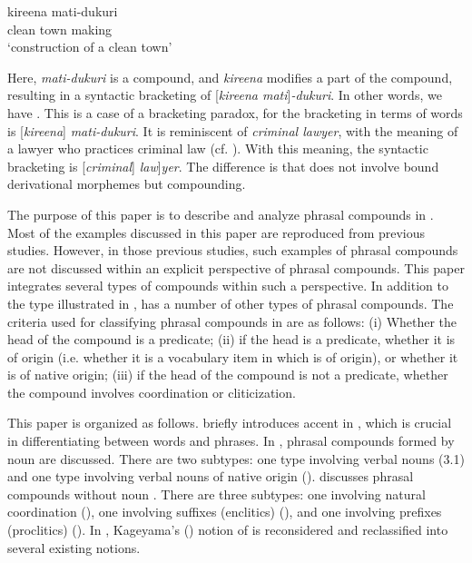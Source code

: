 \documentclass[output=paper]{LSP/langsci}
\begin{document}
\ea\label{ex:nishiyama:3}
\gll   kireena mati-dukuri  \\
    clean  {town making}\\
\glt ‘construction of a clean town’    \citep[518]{Kageyama2009}
\z

Here, \textit{mati-dukuri} is a compound, and \textit{kireena} modifies a part of the compound, resulting in a syntactic bracketing of [\textit{kireena mati}]\textit{-dukuri}. In other words, we have  . This is a case of a bracketing paradox, for the bracketing in terms of  words is [\textit{kireena}] \textit{mati-dukuri}. It is reminiscent of \textit{criminal lawyer}, with the meaning of a lawyer who practices criminal law (cf. \citealt{Beard1991}). With this meaning, the syntactic bracketing is [\textit{criminal}] \textit{law}]\textit{yer}. The difference is that  does not involve bound derivational morphemes but compounding.

The purpose of this paper is to describe and analyze phrasal compounds in . Most of the examples discussed in this paper are reproduced from previous studies. However, in those previous studies, such examples of phrasal compounds are not discussed within an explicit perspective of phrasal compounds. This paper integrates several types of compounds within such a perspective. In addition to the type illustrated in ,  has a number of other types of phrasal compounds. The criteria used for classifying phrasal compounds in  are as follows: 
(i) Whether the head of the compound is a predicate; 
(ii) if the head is a predicate, whether it is of  origin (i.e. whether it is a vocabulary item in  which is of  origin), or whether it is of native origin; 
(iii) if the head of the compound is not a predicate, whether the compound involves coordination or cliticization.

This paper is organized as follows.  briefly introduces accent in , which is crucial in differentiating between words and phrases. In , phrasal compounds formed by noun  are discussed. There are two subtypes: one type involving  verbal nouns (3.1) and one type involving verbal nouns of native origin (). 
 discusses phrasal compounds without noun . There are three subtypes: one involving natural coordination (),
one involving suffixes (enclitics) (), and
one involving prefixes (proclitics) (). 
In , Kageyama’s (\citeyear{Kageyama1993,Kageyama2001,Kageyama2009}) notion of  is reconsidered and reclassified into several existing notions.
\end{document}
